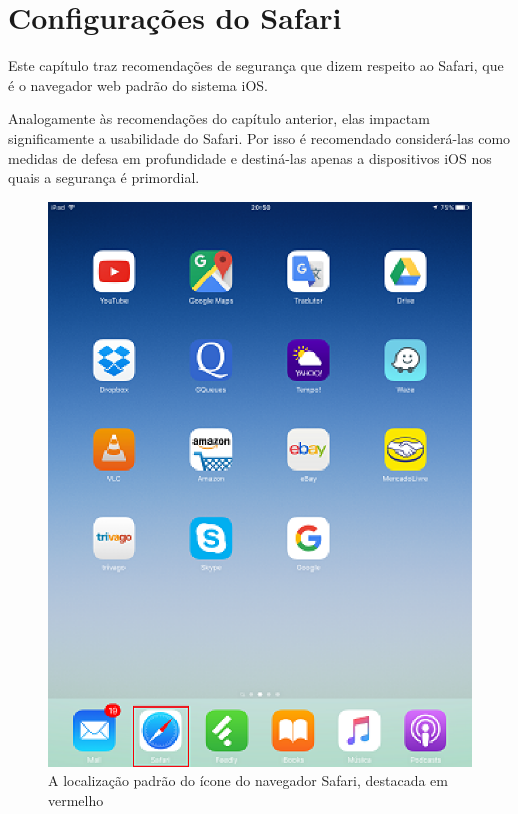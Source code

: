 \chapter{Configura\c c\~oes do Safari}

Este cap\'itulo traz recomenda\c c\~oes de seguran\c ca que dizem respeito ao Safari, que \'e o navegador web padr\~ao do sistema iOS. 

Analogamente \`as recomenda\c c\~oes do cap\'itulo anterior, elas impactam significamente a usabilidade do Safari. Por isso \'e recomendado consider\'a-las como medidas de defesa em profundidade e destin\'a-las apenas a dispositivos iOS nos quais a seguran\c ca \'e primordial.

\begin{figure}[h]
  \centering
  \includegraphics{imagem3.eps}
  \caption{A localiza\c c\~ao padr\~ao do \'icone do navegador Safari, destacada em vermelho}
\end{figure}


